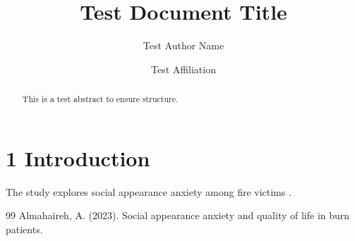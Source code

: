 \documentclass{default}
\begin{document}
\journalheader

\title{Test Document Title}
\author{Test Author Name \and Test Affiliation}
\date{}
\maketitle

\begin{abstract}
This is a test abstract to ensure structure.
\end{abstract}

\section{1 Introduction}

The study explores social appearance anxiety among fire victims \citep{ref1}.

\begin{thebibliography}{99}
Almahaireh, A. (2023). Social appearance anxiety and quality of life in burn patients.

\end{thebibliography}
\end{document}
